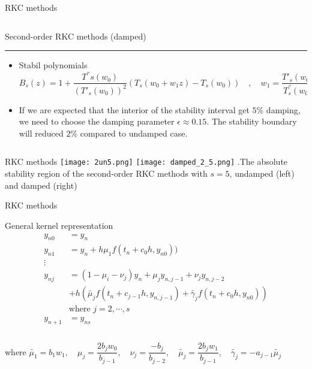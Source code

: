 \documentclass{beamer}
\begin{document}
\begin{frame}{RKC methods}
	\begin{columns}[T] %
		\begin{column}{1.\textwidth}			
			Second-order RKC methods (damped)
			\color{blue}\rule{\linewidth}{3pt}
			\begin{itemize}
				\item Stabil polynomials
				$$B_s(z)=1+\frac{T^{''}s(w_0)}{(T'_s(w_0))^2}(T_s(w_0+w_1z)-T_s(w_0)) \quad, \quad w_1=\frac{T'_s(w_0)}{T^{''}_s(w_0)}$$
				\item If we are expected that the interior of the stability interval get $5\%$ damping, we need to choose the damping parameter $\epsilon \approx 0.15$. The stability boundary will reduced $2\%$ compared to undamped case.
				
			\end{itemize}
		\end{column}%
	\end{columns}
	
\end{frame}
\begin{frame}{RKC methods}
	\texttt{[image: 2un5.png]}
	\texttt{[image: damped\_2\_5.png]}
	\figurename{.The absolute stability region of the second-order RKC methods with $s=5$, undamped (left) and damped (right)}
\end{frame}
\begin{frame}{RKC methods}
\begin{block}{General kernel representation}
		$$\begin{aligned}
		y_{n0}&=y_n\\ 
		y_{n1}&=y_n + h \mu_{1}f(t_n+c_0h,y_{n0}))\\ 
		\vdots \\
		y_{nj}&=(1-\mu_i-\nu_j)y_n+\mu_jy_{n,j-1}+\nu_j y_{n,j-2} \\ &+ h \left( \tilde{\mu_{j}}f(t_n+c_{j-1}h,y_{n,j-1}) +\tilde{\gamma_j}f(t_n+c_0h,y_{n0})\right )\\ &\text{where } j=2, \cdots, s\\
		y_{n+1}&=y_{ns}\\ 
	\end{aligned} $$ \\
	where $\tilde{\mu_{1}} =b_1w_1, \quad \mu_j=\dfrac{2b_jw_0}{b_{j-1}}, \quad \nu_j=\dfrac{-b_j}{b_{j-2}},\quad \tilde{\mu_j}=\dfrac{2b_jw_1}{b_{j-1}}, \quad \tilde{\gamma _j}=-a_{j-1} \tilde{\mu_j}$
	\end{block}
  \end{frame}
\end{document}
